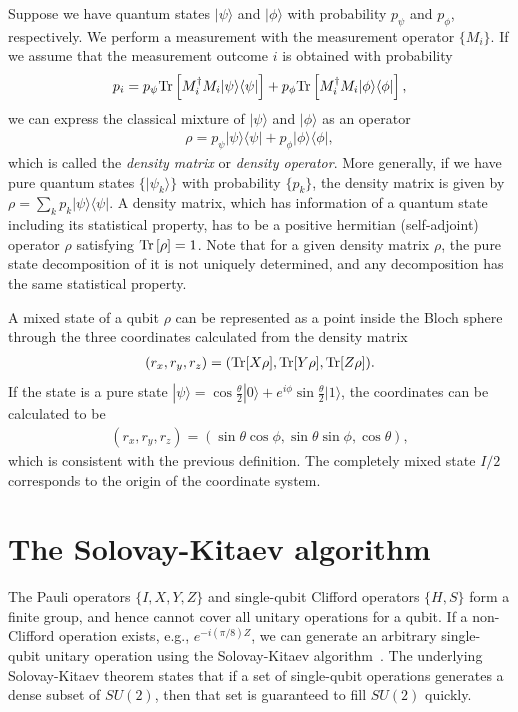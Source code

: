 Suppose we have quantum states $|\psi\rangle$ and $|\phi\rangle$ with probability $p_\psi$ and $p_{\phi}$, respectively.
We perform a measurement with the measurement operator $\{ M_i \}$.
If we assume that the measurement outcome $i$ is obtained with probability 
\begin{eqnarray}
p_i = p_{\psi} {\rm Tr} \left[ M^{\dag}_i M_i | \psi \rangle \langle \psi | \right]
+ p_{\phi} {\rm Tr} \left[ M^{\dag}_i M_i | \phi \rangle \langle \phi | \right],
\end{eqnarray}
we can express the classical mixture of $|\psi\rangle$ and $|\phi\rangle$ as an operator
\begin{eqnarray}
\rho =  p_\psi | \psi \rangle \langle \psi | + p_{\phi} | \phi \rangle \langle \phi |,
\end{eqnarray}
which is called the {\it density matrix} or {\it density operator}.
More generally, if we have pure quantum states $\{ |\psi _ k\rangle \}$ with probability $\{ p_{k}\}$, the density matrix is given by 
$\rho = \sum _k p_k | \psi \rangle \langle \psi |$.
A density matrix, which has information of a quantum state including its statistical property, has to be a positive hermitian (self-adjoint) operator $\rho$ satisfying 
${\rm Tr}\left[ \rho \right]=1$. 
Note that for a given density matrix $\rho$,
the pure state decomposition of it is not uniquely determined,
and any decomposition has the same statistical property.

A mixed state of a qubit $\rho$ can be represented as a point inside the Bloch sphere through the three coordinates calculated from the density matrix
\begin{eqnarray}
(r_x, r_y, r_z) = ( {\rm Tr}[X \rho],{\rm Tr}[Y \rho], {\rm Tr}[Z \rho] ).
\end{eqnarray}
If the state is a pure state $|\psi \rangle = \cos \frac{\theta }{2}|0\rangle+ e^{i \phi} \sin \frac{\theta}{2} |1\rangle$, the coordinates can be calculated to be
\begin{eqnarray}
(r_x, r_y, r_z) =(\sin \theta  \cos \phi,\sin \theta \sin \phi,\cos \theta ),
\end{eqnarray}
which is consistent with the previous definition.
The completely mixed state $I/2$ corresponds to the origin of the coordinate system.

\section{The Solovay-Kitaev algorithm}
The Pauli operators $\{I, X,Y,Z\}$ and single-qubit Clifford operators $\{H,S\}$ form a finite group, and hence cannot cover all unitary operations for a qubit.
If a non-Clifford operation exists, e.g., $e^{-i (\pi/8)Z}$, we can generate an arbitrary single-qubit unitary operation using the Solovay-Kitaev algorithm~\cite{DawsonNielsen05}.
The underlying Solovay-Kitaev theorem states that if a set of single-qubit operations generates a dense subset of $SU(2)$, then that set is guaranteed to fill $SU(2)$ quickly.

